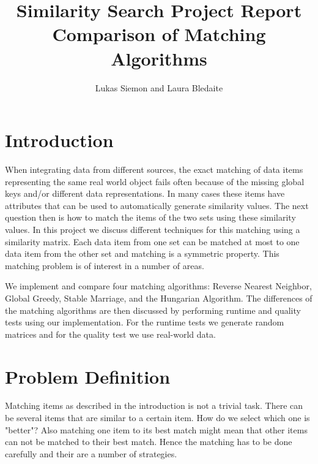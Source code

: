 \documentclass[a4paper,11pt]{article}
\newcommand\etc{\textsl{etc}}
\begin{document}
\title{
  \textbf{\large Similarity Search Project Report}\\
  Comparison of Matching Algorithms
}

\author{Lukas Siemon and Laura Bledaite}
\maketitle


\section{Introduction}

When integrating data from different sources, the exact matching of data items representing the same real world object fails often because of the missing global keys and/or different data representations. In many cases these items have attributes that can be used to automatically generate similarity values. The next question then is how to match the items of the two sets using these similarity values. In this project we discuss different techniques for this matching using a similarity matrix. Each data item from one set can be matched at most to one data item from the other set and matching is a symmetric property. This matching problem is of interest in a number of areas.

We implement and compare four matching algorithms: Reverse Nearest Neighbor, Global Greedy, Stable Marriage, and the Hungarian Algorithm. 
The differences of the matching algorithms are then discussed by performing runtime and quality tests using our implementation. For the runtime tests we generate random matrices and for the quality test we use real-world data.

 

\section{Problem Definition}
Matching items as described in the introduction is not a trivial task. There can be several items that are similar to a certain item. How do we select which one is "better"? Also matching one item to its best match might mean that other items can not be matched to their best match. Hence the matching has to be done carefully and their are a number of strategies.
\end{document}
